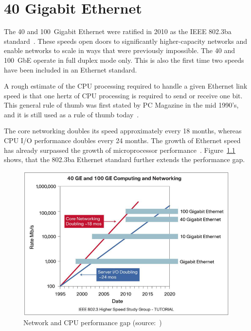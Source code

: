 
\chapter{40 Gigabit Ethernet}\label{chap:40gbe}
The 40 and 100~Gigabit Ethernet were ratified in 2010 as the IEEE 802.3ba standard~\cite{ieee-802.3ba}.
These speeds open doors to significantly higher-capacity networks
and enable networks to scale in ways that were previously impossible.
The 40 and 100~GbE operate in full duplex mode only.
This is also the first time two speeds have been included in an Ethernet standard.

A rough estimate of the CPU processing required to handle a given Ethernet link speed is that
one hertz of CPU processing is required to send or receive one bit.
This general rule of thumb was first stated by PC Magazine in the mid 1990's,
and it is still used as a rule of thumb today~\cite{10gea-toe}.

The core networking doubles its speed approximately every 18 months, whereas
CPU I/O performance doubles every 24 months.
The growth of Ethernet speed has already surpassed
the growth of microprocessor performance~\cite{10gea-toe}.
Figure~\ref{fig:40gbe-performance-gap} shows,
that the 802.3ba Ethernet standard further extends the performance gap.
\begin{figure}
	\centering
	\includegraphics[width=13cm,keepaspectratio]{fig/performance-gap.png}
	\caption{Network and CPU performance gap (source:~\cite{cisco-market-need})}
	\label{fig:40gbe-performance-gap}
	\bigskip
\end{figure}


